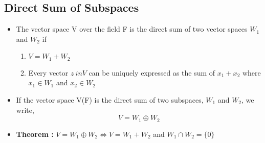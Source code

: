 \documentclass[twoside]{article}
\begin{document}
	\subsection{Direct Sum of Subspaces}
	\begin{itemize}
		\item The vector space V over the field F is the direct sum of two vector spaces $W_1$ and $W_2$ if 
			\begin{enumerate}
				\item $V = W_1 + W_2$
				\item Every vector $z\ in V$ can be uniquely expressed as the sum of $x_1 + x_2$ where $x_1 \in W_1$ and $x_2 \in W_2$
			\end{enumerate}
		\item If the vector space V(F) is the direct sum of two subspaces, $W_1$ and $W_2$, we write,
		\[V = W_1 \oplus W_2\]
		\item {\bf Theorem :} $V = W_1 \oplus W_2 \iff V = W_1 + W_2$ and $W_1 \cap W_2 = \{0\}$
	\end{itemize}
\end{document}
